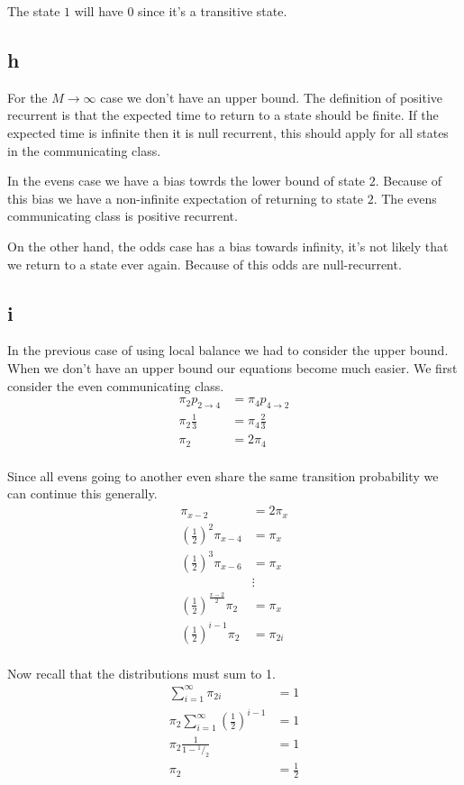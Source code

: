 \documentclass{article}
\begin{document}
The state $1$ will have 0 since it's a transitive state.

\subsection{h}
For the $M \to \infty$ case we don't have an upper bound.
The definition of positive recurrent is that the expected time to return to a
state should be finite. If the expected time is infinite then it is null
recurrent, this should apply for all states in the communicating class.

In the evens case we have a bias towrds the lower bound of state $2$. Because
of this bias we have a non-infinite expectation of returning to state $2$.
The evens communicating class is positive recurrent.

On the other hand, the odds case has a bias towards infinity, it's not likely
that we return to a state ever again. Because of this odds are null-recurrent.

\subsection{i}
In the previous case of using local balance we had to consider the upper bound.
When we don't have an upper bound our equations become much easier.
We first consider the even communicating class.
\begin{align*}
    \pi_2 p_{2 \to 4} &= \pi_4 p_{4 \to 2} \\
    \pi_2 \frac{1}{3} &= \pi_4 \frac{2}{3} \\
    \pi_2 &= 2 \pi_4 \\
\end{align*}

Since all evens going to another even share the same transition probability
we can continue this generally.
\begin{align*}
    \pi_{x-2} &= 2 \pi_x \\
    {\left(\frac{1}{2}\right)}^2 \pi_{x-4} &= \pi_x \\
    {\left(\frac{1}{2}\right)}^3 \pi_{x-6} &= \pi_x \\
    &\vdots \\
    {\left(\frac{1}{2}\right)}^{\frac{x-2}{2}} \pi_{2} &= \pi_x \\
    {\left(\frac{1}{2}\right)}^{i-1} \pi_{2} &= \pi_{2i} \\
\end{align*}

Now recall that the distributions must sum to 1.
\begin{align*}
    \sum_{i=1}^{\infty} \pi_{2i} &= 1 \\
    \pi_{2} \sum_{i=1}^{\infty} {\left(\frac{1}{2}\right)}^{i-1} &= 1 \\
    \pi_{2} \frac{1}{1-{}^1/_2} &= 1 \\
    \pi_{2} &= \frac{1}{2} \\
\end{align*}
\end{document}
